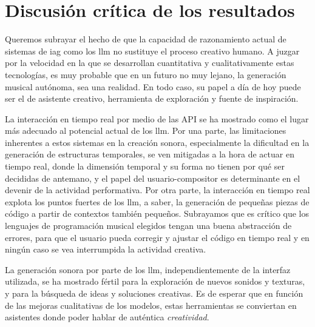 \section{Discusión crítica de los resultados}

Queremos subrayar el hecho de que la capacidad de razonamiento actual de sistemas de \gls{iag} como los \gls{llm} no sustituye el proceso creativo humano. A juzgar por la velocidad en la que se desarrollan cuantitativa y cualitativamente estas tecnologías, es muy probable que en un futuro no muy lejano, la generación musical autónoma, sea una realidad. En todo caso, su papel a día de hoy puede ser el de asistente creativo, herramienta de exploración y fuente de inspiración.

La interacción en tiempo real por medio de las API se ha mostrado como el lugar más adecuado al potencial actual de los \gls{llm}. Por una parte, las limitaciones inherentes a estos sistemas en la creación sonora, especialmente la dificultad en la generación de estructuras temporales, se ven mitigadas a la hora de actuar en tiempo real, donde la dimensión temporal y su forma no tienen por qué ser decididas de antemano, y el papel del usuario-compositor es determinante en el devenir de la actividad performativa. Por otra parte, la interacción en tiempo real explota los puntos fuertes de los \gls{llm}, a saber, la generación de pequeñas piezas de código a partir de contextos también pequeños. Subrayamos que es crítico que los lenguajes de programación musical elegidos tengan una buena abstracción de errores, para que el usuario pueda corregir y ajustar el código en tiempo real y en ningún caso se vea interrumpida la actividad creativa.

La generación sonora por parte de los \gls{llm}, independientemente de la interfaz utilizada, se ha mostrado fértil para la exploración de nuevos sonidos y texturas, y para la búsqueda de ideas y soluciones creativas. Es de esperar que en función de las mejoras cualitativas de los modelos, estas herramientas se conviertan en asistentes donde poder hablar de auténtica \emph{creatividad}. 




